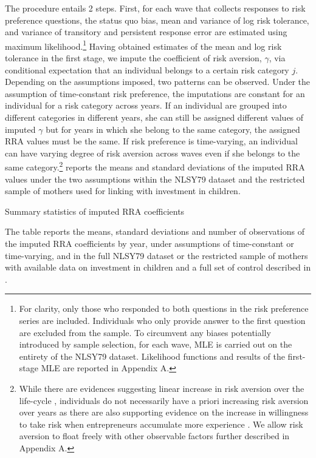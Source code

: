 \documentclass[emulatestandardclasses, 10pt, abstract = true]{scrartcl}
\begin{document}
The procedure entails 2 steps. First, for each wave that collects responses to risk preference questions, the status quo bias, mean and variance of log risk tolerance, and variance of transitory and persistent response error are estimated using maximum likelihood.\footnote{For clarity, only those who responded to both questions in the risk preference series are included. Individuals who only provide answer to the first question are excluded from the sample. To circumvent any biases potentially introduced by sample selection, for each wave, MLE is carried out on the entirety of the NLSY79 dataset. Likelihood functions and results of the first-stage MLE are reported in \alert{Appendix A}.} Having obtained estimates of the mean and log risk tolerance in the first stage, we impute the coefficient of risk aversion, $\gamma$, via conditional expectation that an individual belongs to a certain risk category $j$. Depending on the assumptions imposed, two patterns can be observed. Under the assumption of time-constant risk preference, the imputations are constant for an individual for a risk category across years. \alert{If an individual are grouped into different categories in different years, she can still be assigned different values of imputed $\gamma$ but for years in which she belong to the same category, the assigned RRA values must be the same.} If risk preference is time-varying, an individual can have varying degree of risk aversion across waves even if she belongs to the same category.\footnote{While there are evidences suggesting linear increase in risk aversion over the life-cycle \citep{dohmen2017risk}, individuals do not necessarily have a priori increasing risk aversion over years as there are also supporting evidence on the increase in willingness to take risk when entrepreneurs accumulate more experience  \citep{brachert2017simultaneity,cho2021endogenous}. We allow risk aversion to float freely with other observable factors further described in \alert{Appendix A}.}  reports the means and standard deviations of the imputed RRA values under the two assumptions within the NLSY79 dataset and the restricted sample of mothers used for linking with investment in children.

\begin{table}
	\centering
	\setlength{\extrarowheight}{0.3em}
	\begin{threeparttable}
		\caption{Summary statistics of imputed RRA coefficients}	
		
		\label{table:CRRA-summary}
	\begin{tablenotes}[flushleft]\footnotesize
		\item The table reports the means, standard deviations and number of observations of the imputed RRA coefficients by year, under assumptions of time-constant or time-varying, and in the full NLSY79 dataset or the restricted sample of mothers with available data on investment in children and a full set of control described in .
	\end{tablenotes}
	\end{threeparttable}
\end{table}    
\end{document}
